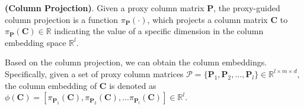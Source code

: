 \begin{myDef}
\textnormal{\textbf{(Column Projection)}}.
Given a proxy column matrix $\mathbf{P}$,  the proxy-guided column projection is a function $\pi_{\mathbf{P}} (\cdot)$, which projects a column matrix $\mathbf{C}$ to $\pi_{\mathbf{P}} (\mathbf{C}) \in \mathbb{R}$ indicating the value of a specific dimension in the column embedding space $\mathbb{R}^l$.
\end{myDef}

Based on the column projection, we can obtain the column embeddings. Specifically,   given a set of proxy column matrices  $\mathcal{P} = \{\mathbf{P}_1, \mathbf{P}_2, \dots, \mathbf{P}_l \} \in \mathbb{R}^{l\times m \times d}$, the column embedding of $\mathbf{C}$ is denoted as $
\phi(\mathbf{C})= \left[\pi_{\mathbf{P}_1} (\mathbf{C}), \pi_{\mathbf{P}_2}(\mathbf{C}), \ldots \pi_{\mathbf{P}_l} (\mathbf{C})\right] \in \mathbb{R}^l$.
 
 